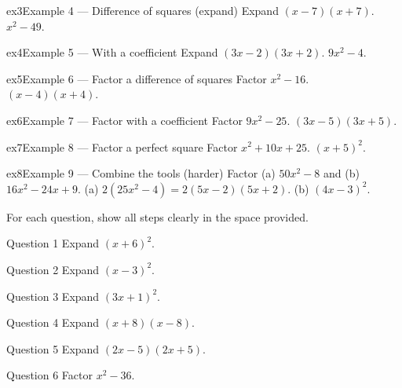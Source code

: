 \documentclass[11pt]{article}
\begin{document}
\begin{example}{ex3}{Example 4 --- Difference of squares (expand)}
Expand $(x-7)(x+7)$.
\soln $x^2-49.$
\end{example}

\begin{example}{ex4}{Example 5 --- With a coefficient}
Expand $(3x-2)(3x+2)$.
\soln $9x^2-4.$
\end{example}

\begin{example}{ex5}{Example 6 --- Factor a difference of squares}
Factor $x^2-16$.
\soln $(x-4)(x+4).$
\end{example}

\begin{example}{ex6}{Example 7 --- Factor with a coefficient}
Factor $9x^2-25$.
\soln $(3x-5)(3x+5).$
\end{example}

\begin{example}{ex7}{Example 8 --- Factor a perfect square}
Factor $x^2+10x+25$.
\soln $(x+5)^2.$
\end{example}

\begin{example}{ex8}{Example 9 --- Combine the tools (harder)}
Factor (a) $50x^2-8$ and (b) $16x^2-24x+9$.
\soln (a) $2(25x^2-4)=2(5x-2)(5x+2)$. (b) $(4x-3)^2.$
\end{example}

\clearpage
{}
For each question, show all steps clearly in the space provided.

\begin{qbox}{Question 1}
Expand $(x+6)^2$.\workspace{1.8cm}
\end{qbox}

\begin{qbox}{Question 2}
Expand $(x-3)^2$.\workspace{1.8cm}
\end{qbox}

\begin{qbox}{Question 3}
Expand $(3x+1)^2$.\workspace{1.8cm}
\end{qbox}

\begin{qbox}{Question 4}
Expand $(x+8)(x-8)$.\workspace{1.8cm}
\end{qbox}

\begin{qbox}{Question 5}
Expand $(2x-5)(2x+5)$.\workspace{1.8cm}
\end{qbox}

\begin{qbox}{Question 6}
Factor $x^2-36$.\workspace{1.8cm}
\end{qbox}
\end{document}
